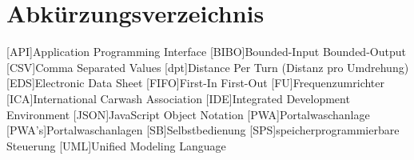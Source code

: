 \newpage
\thispagestyle{plain}

\chapter*{Abkürzungsverzeichnis}

\begin{acronym}[JSON] %
	[API]{Application Programming Interface}
	[BIBO]{Bounded-Input Bounded-Output}
	[CSV]{Comma Separated Values}
	[dpt]{Distance Per Turn (Distanz pro Umdrehung)}
	[EDS]{Electronic Data Sheet}
	[FIFO]{First-In First-Out}
	[FU]{Frequenzumrichter}
	[ICA]{International Carwash Association}
	[IDE]{Integrated Development Environment}
	[JSON]{JavaScript Object Notation}
	[PWA]{Portalwaschanlage}
	[PWA's]{Portalwaschanlagen}
	[SB]{Selbstbedienung}
	[SPS]{speicherprogrammierbare Steuerung}
	[UML]{Unified Modeling Language}
	
\end{acronym}
